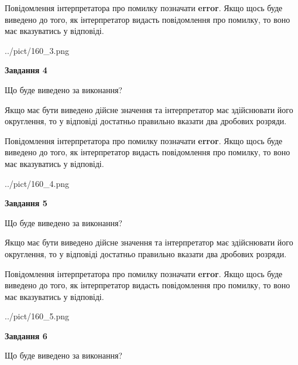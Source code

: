\documentclass[12pt, ukrainian]{article}
\begin{document}
{\begin {Large}
Повідомлення інтерпретатора про помилку позначати \textbf{error}.
Якщо щось буде виведено до того, як інтерпретатор видасть повідомлення про помилку, 
то воно має вказуватись у відповіді. \par

\begin{center}
	{../pict/160_3.png}
\end{center}
\newpage

{\begin {center}\textbf{Завдання 4}\end {center}}\par
Що буде виведено за виконання? \par

Якщо має бути виведено дійсне значення та інтерпретатор має здійснювати його округлення, 
то у відповіді достатньо правильно вказати два дробових розряди.

Повідомлення інтерпретатора про помилку позначати \textbf{error}.
Якщо щось буде виведено до того, як інтерпретатор видасть повідомлення про помилку, 
то воно має вказуватись у відповіді. \par

\begin{center}
	{../pict/160_4.png}
\end{center}
\newpage

{\begin {center}\textbf{Завдання 5}\end {center}}\par
Що буде виведено за виконання? \par

Якщо має бути виведено дійсне значення та інтерпретатор має здійснювати його округлення, 
то у відповіді достатньо правильно вказати два дробових розряди.

Повідомлення інтерпретатора про помилку позначати \textbf{error}.
Якщо щось буде виведено до того, як інтерпретатор видасть повідомлення про помилку, 
то воно має вказуватись у відповіді. \par

\begin{center}
	{../pict/160_5.png}
\end{center}
\newpage

{\begin {center}\textbf{Завдання 6}\end {center}}\par
Що буде виведено за виконання? \par


\end{Large}}
\end{document}
